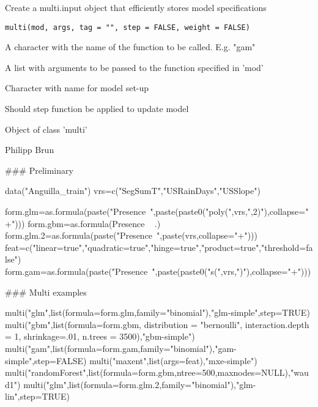 \documentclass[a4paper]{book}
\begin{document}
%
\begin{Description}\relax
Create a multi.input object that efficiently stores model specifications
\end{Description}
%
\begin{Usage}
\begin{verbatim}
multi(mod, args, tag = "", step = FALSE, weight = FALSE)
\end{verbatim}
\end{Usage}
%
\begin{Arguments}
\begin{ldescription}
\item[\code{mod}] A character with the name of the function to be called. E.g. "gam"

\item[\code{args}] A list with arguments to be passed to the function specified in 'mod'

\item[\code{tag}] Character with name for model set-up

\item[\code{step}] Should step function be applied to update model
\end{ldescription}
\end{Arguments}
%
\begin{Value}
Object of class 'multi'
\end{Value}
%
\begin{Author}\relax
Philipp Brun
\end{Author}
%
\begin{Examples}
\begin{ExampleCode}

### Preliminary

data("Anguilla_train")
vrs=c("SegSumT","USRainDays","USSlope")

form.glm=as.formula(paste("Presence~",paste(paste0("poly(",vrs,",2)"),collapse="+")))
form.gbm=as.formula(Presence ~ .)
form.glm.2=as.formula(paste("Presence~",paste(vrs,collapse="+")))
feat=c("linear=true","quadratic=true","hinge=true","product=true","threshold=false")
form.gam=as.formula(paste("Presence~",paste(paste0("s(",vrs,")"),collapse="+")))

### Multi examples

multi("glm",list(formula=form.glm,family="binomial"),"glm-simple",step=TRUE)
multi("gbm",list(formula=form.gbm,
                 distribution = "bernoulli",
                 interaction.depth = 1,
                 shrinkage=.01,
                 n.trees = 3500),"gbm-simple")
multi("gam",list(formula=form.gam,family="binomial"),"gam-simple",step=FALSE)
multi("maxent",list(args=feat),"mxe-simple")
multi("randomForest",list(formula=form.gbm,ntree=500,maxnodes=NULL),"waud1")
multi("glm",list(formula=form.glm.2,family="binomial"),"glm-lin",step=TRUE)

\end{ExampleCode}
\end{Examples}
\end{document}
